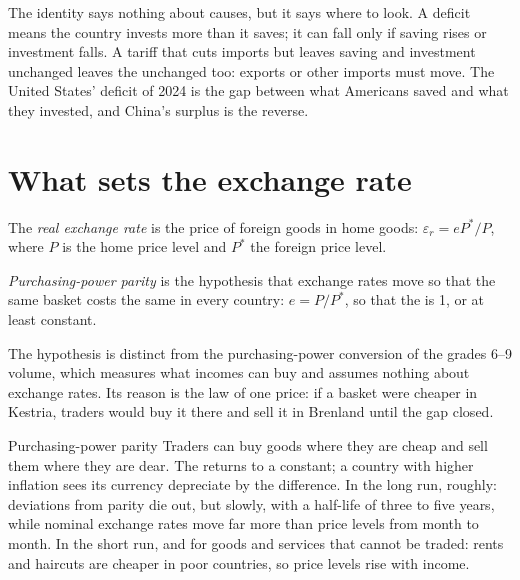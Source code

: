 The identity says nothing about causes, but it says where to look. A  deficit means the country invests more than it saves; it can fall only if saving rises
or investment falls. A tariff that cuts imports but leaves saving and investment unchanged leaves the  unchanged too: exports or other imports must move. The
United States' deficit of 2024 is the gap between what Americans saved and what they invested, and China's surplus is the reverse.

\section{What sets the exchange rate}\label{sec:g12:exchange-rates-and-balance-of-payments:ppp}

\begin{definition}\label{def:g12:exchange-rates-and-balance-of-payments:real-exchange-rate}
The \emph{real exchange rate} is the price of foreign goods in home goods: $\varepsilon_r = e P^*/P$, where $P$ is the home price level and $P^*$
the foreign price level.
\end{definition}

\begin{definition}\label{def:g12:exchange-rates-and-balance-of-payments:ppp}
\emph{Purchasing-power parity} is the hypothesis that exchange rates move so that the same basket costs the same in every country: $e = P/P^*$,
so that the  is 1, or at least constant.
\end{definition}

The hypothesis is distinct from the purchasing-power conversion of the grades 6--9 volume, which measures what incomes can buy and assumes nothing about exchange rates. Its
reason is the law of one price: if a basket were cheaper in Kestria, traders would buy it there and sell it in Brenland until the gap closed.

\begin{model}{Purchasing-power parity}
\assumes Traders can buy goods where they are cheap and sell them where they are dear.
\predicts The  returns to a constant; a country with higher inflation sees its currency depreciate by the difference.
\tested In the long run, roughly: deviations from parity die out, but slowly, with a half-life of three to five years, while nominal exchange rates move far more than price
  levels from month to month.
\breaks In the short run, and for goods and services that cannot be traded: rents and haircuts are cheaper in poor countries, so price levels rise with income.
\end{model}

